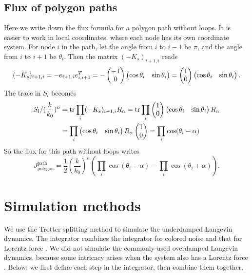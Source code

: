 \documentclass[
 amsmath,amssymb,
 aps,
 pre,
 longbibliography,
 10pt, onecolumn,
 notitlepage
]{revtex4-1}
\begin{document}
\subsection{Flux of polygon paths}
Here we write down the flux formula for a polygon path without loops.
It is easier to work in local coordinates, where each node has its own coordinate system. 
For node $i$ in the path, let the angle from $i$ to $i-1$ be $\pi$, and the angle from $i$ to $i+1$ be $\theta_i$.
Then the matrix $(-K_s)_{i+1,i}$ reads
\begin{equation}
    (-K_s)_{i+1,i} 
    = -e_{i+1,i} e_{i,i+1}^T
    = -\pmqty{-1 \\ 0} \pmqty{\cos\theta_i & \sin\theta_i}
    = \pmqty{1 \\ 0} \pmqty{\cos\theta_i & \sin\theta_i}.
\end{equation}
The trace in $S_l$ becomes
\begin{equation}
    \begin{split}
    S_l / (\frac{k}{k_0})^n
    &= \tr \prod_i (-K_s)_{i+1,i} R_\alpha
    = \tr \prod_i \pmqty{1 \\ 0} \pmqty{\cos\theta_i & \sin\theta_i} R_\alpha \\
    &= \prod_i \pmqty{\cos\theta_i & \sin\theta_i} R_\alpha \pmqty{1 \\ 0}
    = \prod_i \cos(\theta_i - \alpha)
    \end{split}
\end{equation}
So the flux for this path without loops writes
\begin{equation} \label{eqnS:smallk_path_polygon}
    J^\text{path}_\text{polygon} = \frac{1}{2} (\frac{k}{k_0})^n (\prod_i \cos(\theta_i - \alpha) - \prod_i \cos(\theta_i + \alpha)).
\end{equation}


\section{Simulation methods}
We use the Trotter splitting method \cite{Tuckerman1992ReversibleDynamics,Bussi2007AccurateDynamics} to simulate the underdamped Langevin dynamics. 
The integrator combines the integrator for colored noise \cite{Ceriotti2010Colored-NoiseCarte} and that for Lorentz force \cite{Chin2008SymplecticTrajectories}. 
We did not simulate the commonly-used overdamped Langevin dynamics, because some intricacy arises when the system also has a Lorentz force \cite{Chun2018EmergenceForce}.
Below, we first define each step in the integrator, then combine them together.
\end{document}
